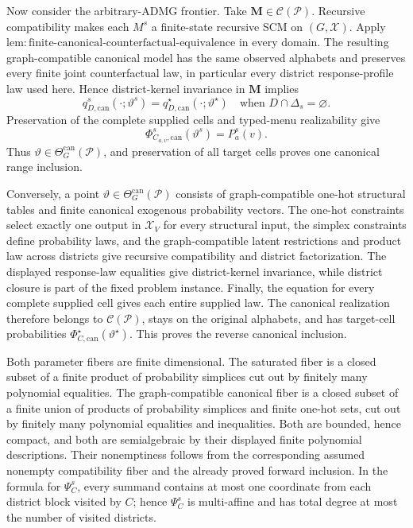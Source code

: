 Now consider the arbitrary-ADMG frontier. Take \(\mathbf M\in\mathcal C(\mathcal P)\). Recursive compatibility makes each \(M^s\) a finite-state recursive SCM on \((G,\mathcal X)\). Apply \(\mathrm{lem:finite\text{-}canonical\text{-}counterfactual\text{-}equivalence}\) in every domain. The resulting graph-compatible canonical model has the same observed alphabets and preserves every finite joint counterfactual law, in particular every district response-profile law used here. Hence district-kernel invariance in \(\mathbf M\) implies
\[
q_{D,\mathrm{can}}^s(\cdot;\vartheta^s)
=q_{D,\mathrm{can}}^\star(\cdot;\vartheta^\star)
\quad\text{when }D\cap\Delta_s=\varnothing.
\]
Preservation of the complete supplied cells and typed-menu realizability give
\[
\Phi_{C_{a,v},\mathrm{can}}^s(\vartheta^s)=P_a^s(v).
\]
Thus \(\vartheta\in\Theta_G^{\mathrm{can}}(\mathcal P)\), and preservation of all target cells proves one canonical range inclusion.

Conversely, a point \(\vartheta\in\Theta_G^{\mathrm{can}}(\mathcal P)\) consists of graph-compatible one-hot structural tables and finite canonical exogenous probability vectors. The one-hot constraints select exactly one output in \(\mathcal X_V\) for every structural input, the simplex constraints define probability laws, and the graph-compatible latent restrictions and product law across districts give recursive compatibility and district factorization. The displayed response-law equalities give district-kernel invariance, while district closure is part of the fixed problem instance. Finally, the equation for every complete supplied cell gives each entire supplied law. The canonical realization therefore belongs to \(\mathcal C(\mathcal P)\), stays on the original alphabets, and has target-cell probabilities \(\Phi_{C,\mathrm{can}}^\star(\vartheta^\star)\). This proves the reverse canonical inclusion.

Both parameter fibers are finite dimensional. The saturated fiber is a closed subset of a finite product of probability simplices cut out by finitely many polynomial equalities. The graph-compatible canonical fiber is a closed subset of a finite union of products of probability simplices and finite one-hot sets, cut out by finitely many polynomial equalities and inequalities. Both are bounded, hence compact, and both are semialgebraic by their displayed finite polynomial descriptions. Their nonemptiness follows from the corresponding assumed nonempty compatibility fiber and the already proved forward inclusion. In the formula for \(\Psi_C^s\), every summand contains at most one coordinate from each district block visited by \(C\); hence \(\Psi_C^s\) is multi-affine and has total degree at most the number of visited districts.

